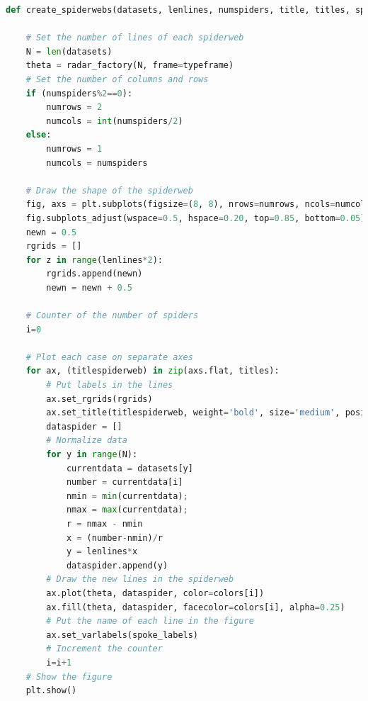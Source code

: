 \begin{lstlisting}[language=Python, caption=Generación de graficos de radar, label=lst:c3]
def create_spiderwebs(datasets, lenlines, numspiders, title, titles, spoke_labels, colors, typeframe):

    # Set the number of lines of each spiderweb
    N = len(datasets)
    theta = radar_factory(N, frame=typeframe)
    # Set the number of columns and rows
    if (numspiders%2==0):
        numrows = 2
        numcols = int(numspiders/2)
    else:
        numrows = 1
        numcols = numspiders
        
    # Draw the shape of the spiderweb
    fig, axs = plt.subplots(figsize=(8, 8), nrows=numrows, ncols=numcols, subplot_kw=dict(projection='radar'))
    fig.subplots_adjust(wspace=0.5, hspace=0.20, top=0.85, bottom=0.05)
    newn = 0.5
    rgrids = []
    for z in range(lenlines*2):
        rgrids.append(newn)
        newn = newn + 0.5

    # Counter of the number of spiders
    i=0

    # Plot each case on separate axes
    for ax, (titlespiderweb) in zip(axs.flat, titles):
        # Put labels in the lines
        ax.set_rgrids(rgrids)        
        ax.set_title(titlespiderweb, weight='bold', size='medium', position=(0.5, 1.1))
        dataspider = []
        # Normalize data
        for y in range(N):
            currentdata = datasets[y]
            number = currentdata[i]
            nmin = min(currentdata);
            nmax = max(currentdata);
            r = nmax - nmin
            x = (number-nmin)/r
            y = lenlines*x
            dataspider.append(y)
        # Draw the new lines in the spiderweb
        ax.plot(theta, dataspider, color=colors[i])
        ax.fill(theta, dataspider, facecolor=colors[i], alpha=0.25)
        # Put the name of each line in the figure
        ax.set_varlabels(spoke_labels)
        # Increment the counter
        i=i+1
    # Show the figure
    plt.show()
\end{lstlisting}

